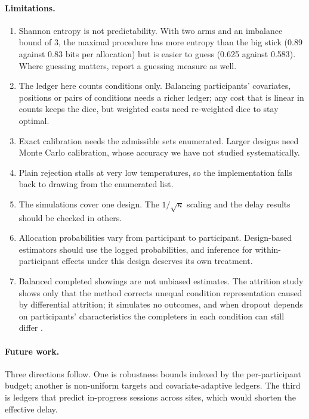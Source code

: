 \documentclass[11pt]{article}
\begin{document}
\paragraph{Limitations.}
\begin{enumerate}
\item Shannon entropy is not predictability. With two arms and an imbalance bound of 3, the maximal procedure has more entropy than the big stick (0.89 against 0.83 bits per allocation) but is easier to guess (0.625 against 0.583). Where guessing matters, report a guessing measure as well.
\item The ledger here counts conditions only. Balancing participants' covariates, positions or pairs of conditions needs a richer ledger; any cost that is linear in counts keeps the dice, but weighted costs need re-weighted dice to stay optimal.
\item Exact calibration needs the admissible sets enumerated. Larger designs need Monte Carlo calibration, whose accuracy we have not studied systematically.
\item Plain rejection stalls at very low temperatures, so the implementation falls back to drawing from the enumerated list.
\item The simulations cover one design. The $1/\sqrt{\kappa}$ scaling and the delay results should be checked in others.
\item Allocation probabilities vary from participant to participant. Design-based estimators should use the logged probabilities, and inference for within-participant effects under this design deserves its own treatment.
\item Balanced completed showings are not unbiased estimates. The attrition study shows only that the method corrects unequal condition representation caused by differential attrition; it simulates no outcomes, and when dropout depends on participants' characteristics the completers in each condition can still differ \citep{zhou2016}.
\end{enumerate}

\paragraph{Future work.} Three directions follow. One is robustness bounds indexed by the per-participant budget; another is non-uniform targets and covariate-adaptive ledgers. The third is ledgers that predict in-progress sessions across sites, which would shorten the effective delay.
\end{document}
